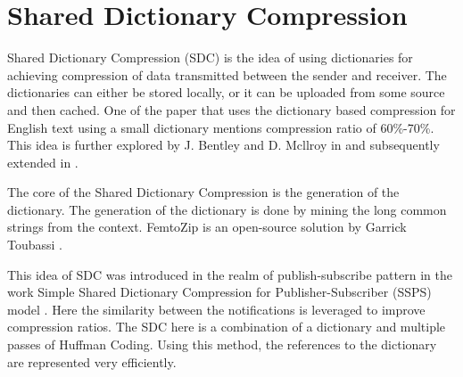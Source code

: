 \section{Shared Dictionary Compression}

Shared Dictionary Compression (SDC) is the idea of using dictionaries for achieving compression of data transmitted between the sender and receiver. The dictionaries can either be stored locally, or it can be uploaded from some source and then cached. One of the paper\parencite{Bell:1989:MTC:76894.76896} that uses the dictionary based compression for English text using a small dictionary mentions compression ratio of 60\%-70\%. This idea is further explored by J. Bentley and D. Mcllroy in \parencite{755678} and subsequently extended in \parencite{Bentley:2001:DCL:508081.508083}.

The core of the Shared Dictionary Compression is the generation of the dictionary. The generation of the dictionary is done by mining the long common strings from the context. FemtoZip \parencite{femtozip} is an open-source solution by Garrick Toubassi \parencite{sdc_linkedin}.

This idea of SDC was introduced in the realm of publish-subscribe pattern in the work Simple Shared Dictionary Compression for Publisher-Subscriber (SSPS) model \parencite{Doblander:2016:SDC}. Here the similarity between the notifications is leveraged to improve compression ratios. The SDC here is a combination of a dictionary and multiple passes of Huffman Coding. Using this method, the references to the dictionary are represented very efficiently. 